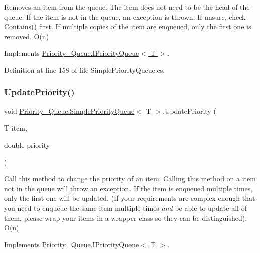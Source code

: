 Removes an item from the queue. The item does not need to be the head of the queue. If the item is not in the queue, an exception is thrown. If unsure, check \hyperlink{class_priority___queue_1_1_simple_priority_queue_a7c557aba4037622190880b129a0ee7dd}{Contains()} first. If multiple copies of the item are enqueued, only the first one is removed. O(n) 



Implements \hyperlink{interface_priority___queue_1_1_i_priority_queue_a4140ec265c23d3b230d701a25def6cf9}{Priority\+\_\+\+Queue.\+I\+Priority\+Queue$<$ T $>$}.



Definition at line 158 of file Simple\+Priority\+Queue.\+cs.

\mbox{\label{class_priority___queue_1_1_simple_priority_queue_a90988345298443d824db48ae0fa35f2f}} 
\subsubsection{\texorpdfstring{Update\+Priority()}{UpdatePriority()}}
{\footnotesize\ttfamily void \hyperlink{class_priority___queue_1_1_simple_priority_queue}{Priority\+\_\+\+Queue.\+Simple\+Priority\+Queue}$<$ T $>$.Update\+Priority (\begin{DoxyParamCaption}\item[{T}]{item,  }\item[{double}]{priority }\end{DoxyParamCaption})}



Call this method to change the priority of an item. Calling this method on a item not in the queue will throw an exception. If the item is enqueued multiple times, only the first one will be updated. (If your requirements are complex enough that you need to enqueue the same item multiple times {\itshape and} be able to update all of them, please wrap your items in a wrapper class so they can be distinguished). O(n) 



Implements \hyperlink{interface_priority___queue_1_1_i_priority_queue_a2f2576faa1974a2266d155addb431db2}{Priority\+\_\+\+Queue.\+I\+Priority\+Queue$<$ T $>$}.



